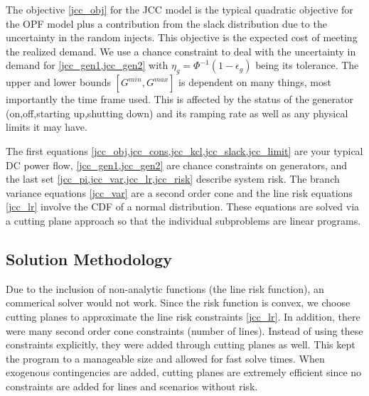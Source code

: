 The objective \ref{jcc_obj} for the JCC model is the typical quadratic objective for the OPF model plus a contribution from the slack distribution due to the uncertainty in the random injects.  This objective is the expected cost of meeting the realized demand.  We use a chance constraint to deal with the uncertainty in demand for \cref{jcc_gen1,jcc_gen2} with $\eta_g = \Phi^{-1}(1-\epsilon_g)$ being its tolerance.  The upper and lower bounds $[G^{min},G^{max}]$ is dependent on many things, most importantly the time frame used.  This is affected by the status of the generator (on,off,starting up,shutting down) and its ramping rate as well as any physical limits it may have.  

The first equations \cref{jcc_obj,jcc_cons,jcc_kcl,jcc_slack,jcc_limit} are your typical DC power flow, \cref{jcc_gen1,jcc_gen2} are chance constraints on generators, and the last set \cref{jcc_pi,jcc_var,jcc_lr,jcc_risk} describe system risk.  The branch variance equations \ref{jcc_var} are a second order cone and the line risk equations \ref{jcc_lr} involve the CDF of a normal distribution.  These equations are solved via a cutting plane approach so that the individual subproblems are linear programs.


\subsection{Solution Methodology}\label{solutionmethodology}
Due to the inclusion of non-analytic functions (the line risk function), an commerical solver would not work.  Since the risk function is convex, we choose cutting planes to approximate the line risk constraints \ref{jcc_lr}.  In addition, there were many second order cone constraints (number of lines).  Instead of using these constraints explicitly, they were added through cutting planes as well.  This kept the program to a manageable size and allowed for fast solve times.  When exogenous contingencies are added, cutting planes are extremely efficient since no constraints are added for lines and scenarios without risk.

